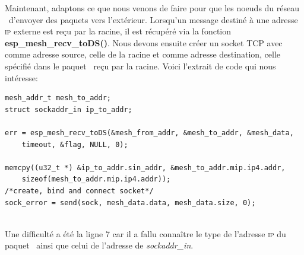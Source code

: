             
            Maintenant, adaptons ce que nous venons de faire pour que les noeuds du réseau \espmesh\ d'envoyer des paquets vers l'extérieur.
            Lorsqu'un message destiné à une adresse \textsc{ip} externe est reçu par la racine, il est récupéré via la fonction
            \textbf{esp\_mesh\_recv\_toDS()}. Nous devons ensuite créer un socket TCP avec comme adresse source, celle de la racine
            et comme adresse destination, celle spécifié dans le paquet \espmesh\ reçu par la racine.
            Voici l'extrait de code qui nous intéresse:
            \begin{verbatim}
mesh_addr_t mesh_to_addr;
struct sockaddr_in ip_to_addr;

err = esp_mesh_recv_toDS(&mesh_from_addr, &mesh_to_addr, &mesh_data, 
    timeout, &flag, NULL, 0);

memcpy((u32_t *) &ip_to_addr.sin_addr, &mesh_to_addr.mip.ip4.addr,
    sizeof(mesh_to_addr.mip.ip4.addr));
/*create, bind and connect socket*/
sock_error = send(sock, mesh_data.data, mesh_data.size, 0);
                
            \end{verbatim}
            Une difficulté a été la ligne 7 car il a fallu connaître le type de l'adresse \textsc{ip} du paquet \espmesh\ 
            ainsi que celui de l'adresse de \textit{sockaddr\_in}.

